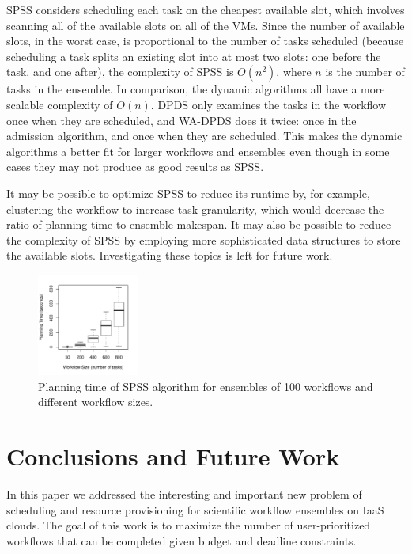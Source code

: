 \documentclass[conference]{IEEEtran}
\begin{document}
SPSS considers scheduling each task on the cheapest available slot, which
involves scanning all of the available slots on all of the VMs. Since the number
of available slots, in the worst case, is proportional to the number of tasks
scheduled (because scheduling a task splits an existing slot into at most two
slots: one before the task, and one after), the complexity of SPSS is
$O(n^2)$, where $n$ is the number of tasks in the ensemble. In comparison, the
dynamic algorithms all have a more scalable complexity of $O(n)$. DPDS only
examines the tasks in the workflow once when they are scheduled, and WA-DPDS
does it twice: once in the admission algorithm, and once when they are
scheduled. This makes the dynamic algorithms a better fit for larger workflows
and ensembles even though in some cases they may not produce as good results
as SPSS.

It may be possible to optimize SPSS to reduce its runtime by, for example,
clustering the workflow to increase task granularity, which would decrease the
ratio of planning time to ensemble makespan. It may also be possible to reduce
the complexity of SPSS by employing more sophisticated data structures to
store the available slots. Investigating these topics is left for future work.


\begin{figure}[tb]
    \centering
    \vspace{-6mm}
    \includegraphics[width=0.30\textwidth]{spss_planning_time}
    \vspace{-3mm}
    \caption{Planning time of SPSS algorithm for ensembles of 100 workflows and different workflow sizes.}
    \label{fig:spss_planning_time}
\end{figure}

\section{Conclusions and Future Work}
\label{sec:conclusions}

In this paper we addressed the interesting and important new problem of
scheduling and resource provisioning for scientific workflow ensembles on IaaS
clouds. The goal of this work is to maximize the number of user-prioritized
workflows that can be completed given budget and deadline constraints.
\end{document}
